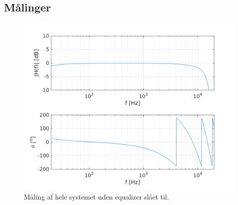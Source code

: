 

	

%
%
%






\subsection{Målinger}
\begin{figure}[h!]
\centering
\includegraphics[scale = 0.8]{matlabdemo/test/test_eq_off.png}  
\caption{Måling af hele systemet uden equalizer slået til.}
\label{fig:eq_off1}
\end{figure}


